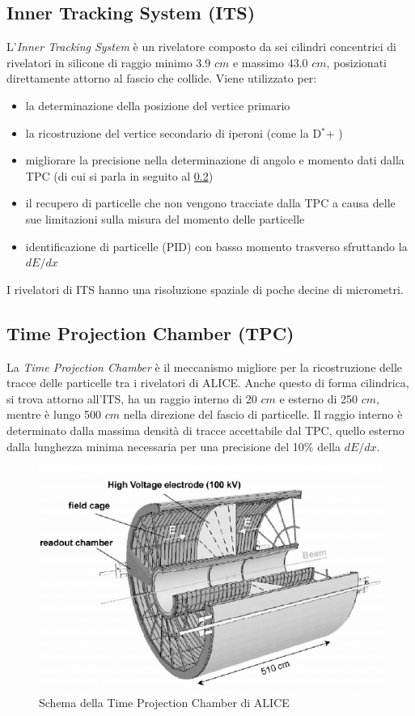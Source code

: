     \subsection{Inner Tracking System (ITS)} \label{ITS}
    L'\textit{Inner Tracking System} è un rivelatore composto da sei cilindri concentrici di rivelatori in silicone di raggio minimo 3.9 $cm$ e massimo 43.0 $cm$, posizionati direttamente attorno al fascio che collide. Viene utilizzato per:
    \begin{itemize}
        \item la determinazione della posizione del vertice primario %
        \item la ricostruzione del vertice secondario di iperoni (come la D$^*$+  )
        \item migliorare la precisione nella determinazione di angolo e momento dati dalla TPC (di cui si parla in seguito al \ref{TPC})
        \item il recupero di particelle che non vengono tracciate dalla TPC a causa delle sue limitazioni sulla misura del momento delle particelle
        \item identificazione di particelle (PID) con basso momento trasverso sfruttando la $dE/dx$
    \end{itemize}
    
    I rivelatori di ITS hanno una risoluzione spaziale di poche decine di micrometri. \cite{tesi_barbano}
    
    \subsection{Time Projection Chamber  (TPC)} \label{TPC}
    La \textit{Time Projection Chamber}  è il meccanismo migliore per la ricostruzione delle tracce delle particelle tra i rivelatori di ALICE. Anche questo di forma cilindrica, si trova attorno all'ITS, ha un raggio interno di 20 $cm$ e esterno di 250 $cm$, mentre è lungo 500 $cm$ nella direzione del fascio di particelle. Il raggio interno è determinato dalla massima densità di tracce accettabile dal TPC, quello esterno dalla lunghezza minima necessaria per una precisione del 10$\%$ della $dE/dx$. 
     
     \begin{figure}[htbp]
        \centering
        \includegraphics[width=0.6\linewidth]{ALICE/ALICE-TPC-detector.png}
        \caption{Schema della Time Projection Chamber di ALICE}
        \label{fig:TPCcomplex}
    \end{figure}
    
